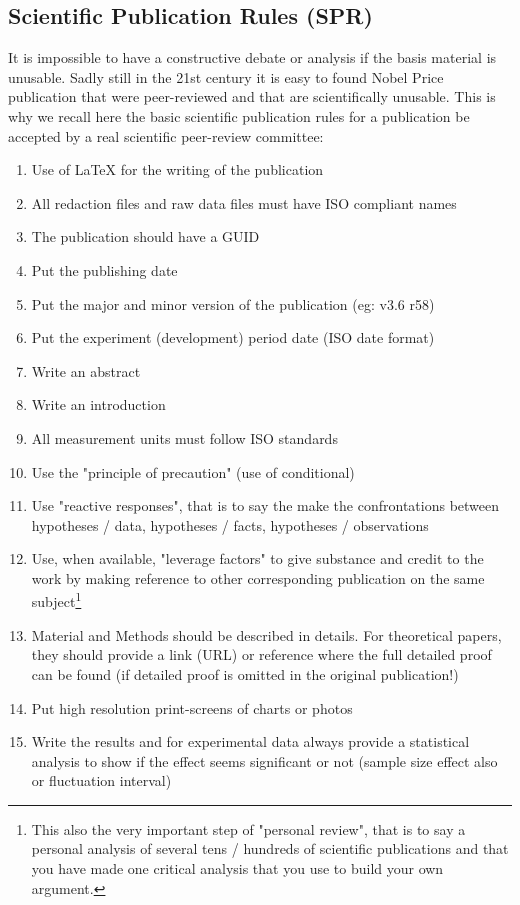 	\pagebreak
	\subsection{Scientific Publication Rules (SPR)}
	It is impossible to have a constructive debate or analysis if the basis material is unusable. Sadly still in the 21st century it is easy to found Nobel Price publication that were peer-reviewed and that are scientifically unusable. This is why we recall here the basic scientific publication rules for a publication be accepted by a real scientific peer-review committee:
	\begin{enumerate}
		\item Use of LaTeX for the writing of the publication
		\item All redaction files and raw data files must have ISO compliant names
		\item The publication should have a GUID
		\item Put the publishing date
		\item Put the major and minor version of the publication (eg: v3.6 r58)
		\item Put the experiment (development) period date (ISO date format)
		\item Write an abstract
		\item Write an introduction
		\item All measurement units must follow ISO standards
		\item Use the "principle of precaution" (use of conditional)
		\item Use "reactive responses", that is to say the make the confrontations between hypotheses / data, hypotheses / facts, hypotheses / observations 
		\item Use, when available, "leverage factors" to give substance and credit to the work by making reference to other corresponding publication on the same subject\footnote{This also the very important step of "personal review", that is to say a personal analysis of several tens / hundreds of scientific publications and that you have made one critical analysis that you use to build your own argument.}
		\item Material and Methods should be described in details. For theoretical papers, they should provide a link (URL) or reference where the full detailed proof can be found (if detailed proof is omitted in the original publication!)
		\item Put high resolution print-screens of charts or photos
		\item Write the results and for experimental data always provide a statistical analysis to show if the effect seems significant or not (sample size effect also or fluctuation interval)

\end{enumerate}
